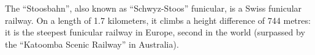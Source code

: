 The ``Stoosbahn'', also known as ``Schwyz-Stoos'' funicular, is a Swiss funicular railway.
On a length of 1.7 kilometers, it climbs a height difference of 744 metres: it is the steepest funicular railway in Europe, second in the world (surpassed by the ``Katoomba Scenic Railway'' in Australia).